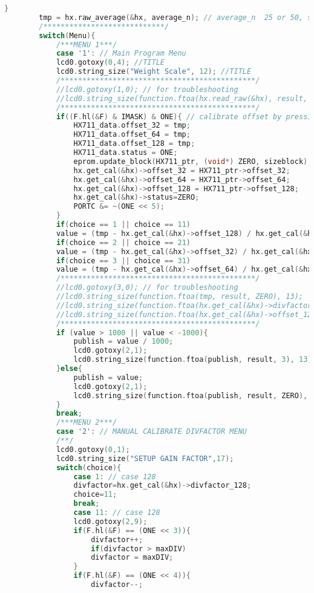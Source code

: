 \begin{lstlisting}[language=C, caption={main.c}, label=main-c, captionpos=b]
		}
		tmp = hx.raw_average(&hx, average_n); // average_n  25 or 50, smaller means faster or more readings
		/****************************/
		switch(Menu){
			/***MENU 1***/
			case '1': // Main Program Menu
			lcd0.gotoxy(0,4); //TITLE
			lcd0.string_size("Weight Scale", 12); //TITLE
			/*********************************************/
			//lcd0.gotoxy(1,0); // for troubleshooting
			//lcd0.string_size(function.ftoa(hx.read_raw(&hx), result, ZERO), 13);
			/*********************************************/
			if((F.hl(&F) & IMASK) & ONE){ // calibrate offset by pressing button 1
				HX711_data.offset_32 = tmp;
				HX711_data.offset_64 = tmp;
				HX711_data.offset_128 = tmp;
				HX711_data.status = ONE;
				eprom.update_block(HX711_ptr, (void*) ZERO, sizeblock);
				hx.get_cal(&hx)->offset_32 = HX711_ptr->offset_32;
				hx.get_cal(&hx)->offset_64 = HX711_ptr->offset_64;
				hx.get_cal(&hx)->offset_128 = HX711_ptr->offset_128;
				hx.get_cal(&hx)->status=ZERO;
				PORTC &= ~(ONE << 5);
			}
			if(choice == 1 || choice == 11)
			value = (tmp - hx.get_cal(&hx)->offset_128) / hx.get_cal(&hx)->divfactor_128; //value to be published to LCD
			if(choice == 2 || choice == 21)
			value = (tmp - hx.get_cal(&hx)->offset_32) / hx.get_cal(&hx)->divfactor_32; //value to be published to LCD
			if(choice == 3 || choice == 31)
			value = (tmp - hx.get_cal(&hx)->offset_64) / hx.get_cal(&hx)->divfactor_64; //value to be published to LCD
			/*********************************************/
			//lcd0.gotoxy(3,0); // for troubleshooting
			//lcd0.string_size(function.ftoa(tmp, result, ZERO), 13);
			//lcd0.string_size(function.ftoa(hx.get_cal(&hx)->divfactor_128, result, ZERO), 13);
			//lcd0.string_size(function.ftoa(hx.get_cal(&hx)->offset_128, result, ZERO), 13);
			/*********************************************/
			if (value > 1000 || value < -1000){
				publish = value / 1000;
				lcd0.gotoxy(2,1);
				lcd0.string_size(function.ftoa(publish, result, 3), 13); lcd0.string_size("Kg", 4);
			}else{
				publish = value;
				lcd0.gotoxy(2,1);
				lcd0.string_size(function.ftoa(publish, result, ZERO), 13); lcd0.string_size("gram", 4);
			}
			break;
			/***MENU 2***/
			case '2': // MANUAL CALIBRATE DIVFACTOR MENU
			/**/
			lcd0.gotoxy(0,1);
			lcd0.string_size("SETUP GAIN FACTOR",17);
			switch(choice){
				case 1: // case 128
				divfactor=hx.get_cal(&hx)->divfactor_128;
				choice=11;
				break;
				case 11: // case 128
				lcd0.gotoxy(2,9);
				if(F.hl(&F) == (ONE << 3)){
					divfactor++;
					if(divfactor > maxDIV)
					divfactor = maxDIV;
				}
				if(F.hl(&F) == (ONE << 4)){
					divfactor--;

\end{lstlisting}
